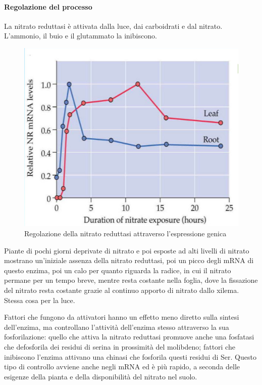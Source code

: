 \documentclass[a4paper,12pt]{book}
\begin{document}
\paragraph{Regolazione del processo}
La nitrato reduttasi è attivata dalla luce, dai carboidrati e dal nitrato. L'ammonio, il buio e il glutammato la inibiscono.
\begin{figure}[H]
\centering
\includegraphics[scale=0.3]{immagini/regolazione.jpg}
\caption{Regolazione della nitrato reduttasi attraverso l'espressione genica}
\end{figure}
Piante di pochi giorni deprivate di nitrato e poi esposte ad alti livelli di nitrato mostrano un'iniziale assenza della nitrato reduttasi, poi un picco degli mRNA di questo enzima, poi un calo per quanto riguarda la radice, in cui il nitrato permane per un tempo breve, mentre resta costante nella foglia, dove la fissazione del nitrato resta costante grazie al continuo apporto di nitrato dallo xilema. Stessa cosa per la luce.

Fattori che fungono da attivatori hanno un effetto meno diretto sulla sintesi dell'enzima, ma controllano l'attività dell'enzima stesso attraverso la sua fosforilazione: quello che attiva la nitrato reduttasi promuove anche una fosfatasi che defosforila dei residui di serina in prossimità del molibdeno; fattori che inibiscono l'enzima attivano una chinasi che fosforila questi residui di Ser. Questo tipo di controllo avviene anche negli mRNA ed è più rapido, a seconda delle esigenze della pianta e della disponibilità del nitrato nel suolo.
\end{document}

